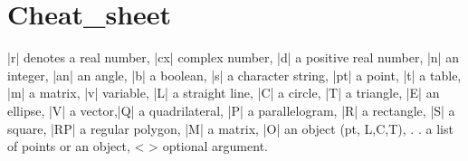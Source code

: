 \documentclass[DIV         = 14,
               fontsize    = 10,
               index       = totoc,
               twoside,
               cadre,
               headings    = small
               ]{tkz-doc}
\begin{document}
\clearpage


\tableofcontents

\clearpage
\newpage
























\clearpage\newpage
\small\printindex

\newpage
\section{Cheat\_sheet} %
\label{sec:cheat_sheet}

|r| denotes a real number, |cx| complex number, |d| a positive real number, |n| an integer, |an| an angle, |b| a boolean, |s| a character string, |pt| a point, |t| a table, |m| a matrix, |v| variable, |L| a straight line, |C| a circle, |T| a triangle, |E| an ellipse, |V| a vector,|Q| a quadrilateral, |P| a parallelogram, |R| a rectangle, |S| a square, |RP| a regular polygon, |M| a matrix, |O| an object (pt, L,C,T), . . a list of points or an object, < > optional argument. 
\end{document}
